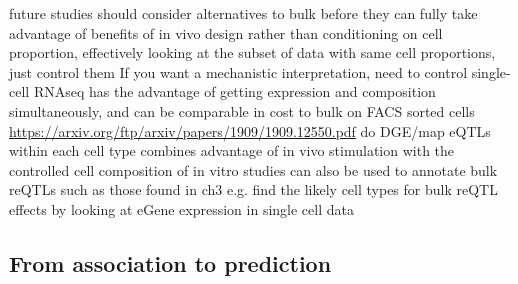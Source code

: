 \begin{outline}
\1 future studies should consider alternatives to bulk before they can fully take advantage of benefits of in vivo design
    \2 rather than conditioning on cell proportion, effectively looking at the subset of data with same cell proportions, just control them
    \2 If you want a mechanistic interpretation, need to control
    \2 single-cell RNAseq has the advantage of getting expression and composition simultaneously, and can be comparable in cost to bulk on FACS sorted cells \url{https://arxiv.org/ftp/arxiv/papers/1909/1909.12550.pdf}
    \2 do DGE/map eQTLs within each cell type 
        \3 combines advantage of in vivo stimulation with the controlled cell composition of in vitro studies
    \2 can also be used to annotate bulk reQTLs such as those found in ch3 e.g. find the likely cell types for bulk reQTL effects by looking at eGene expression in single cell data \autocite{devries2020IntegratingGWASBulk}

%
%
%
%

\subsection{From association to prediction}


\end{outline}
